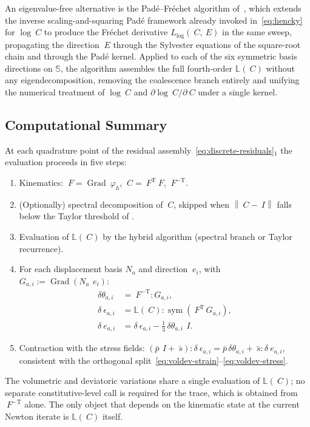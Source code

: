 \documentclass[12pt]{article}
\newcommand{\F}{~F}
\newcommand{\C}{~C}
\newcommand{\eps}{~\epsilon}
\newcommand{\edev}{~e}
\newcommand{\sbar}{\bar{~s}}
\newcommand{\pbar}{\bar{p}}
\newcommand{\Syms}{\mathbb{S}}
\newcommand{\norm}[1]{\left\lVert {#1} \right\rVert}
\DeclareMathOperator{\Grad}{Grad}
\DeclareMathOperator{\sym}{sym}
\newcommand{\transpose}[1]{{#1}^{\mathrm{T}}}
\begin{document}
An eigenvalue-free alternative is the Pad\'e--Fr\'echet algorithm
of~\citet{AlMohy.Higham.Relton:2013}, which extends the inverse
scaling-and-squaring Pad\'e framework already invoked
in~\eqref{eq:hencky} for $\log\C$ to produce the Fr\'echet
derivative $L_{\log}(\C, ~E)$ in the same sweep, propagating the
direction $~E$ through the Sylvester equations of the square-root
chain and through the Pad\'e kernel. Applied to each of the six
symmetric basis directions on $\Syms$, the algorithm assembles the
full fourth-order $\mathbb{L}(\C)$ without any eigendecomposition,
removing the coalescence branch entirely and unifying the numerical
treatment of $\log\C$ and $\partial \log\C / \partial \C$ under a
single kernel.

\subsection{Computational Summary}
\label{app:summary}

At each quadrature point of the residual
assembly~\eqref{eq:discrete-residuals}$_1$ the evaluation proceeds in
five steps:
\begin{enumerate}
  \item Kinematics: $\F = \Grad ~\varphi_h$,
    $\C = \transpose{\F}\F$, $\F^{-\mathrm{T}}$.
  \item (Optionally) spectral decomposition of $\C$, skipped when
    $\norm{\C - ~I}$ falls below the Taylor threshold of
    \citet{Ortiz.Radovitzky.Repetto:2001}.
  \item Evaluation of $\mathbb{L}(\C)$ by the hybrid algorithm
    (spectral branch or Taylor recurrence).
  \item For each displacement basis $N_a$ and direction
    $~e_i$, with $G_{a,i} := \Grad(N_a\, ~e_i)$:
    \begin{align*}
      \delta\theta_{a,i}
        & =
        \F^{-\mathrm{T}} : G_{a,i},
      \\
      \delta\eps_{a,i}
        & =
        \mathbb{L}(\C) : \sym\!\left(\transpose{\F}\, G_{a,i}\right),
      \\
      \delta\edev_{a,i}
        & =
        \delta\eps_{a,i}
        -
        \tfrac{1}{3}\,\delta\theta_{a,i}\, ~I.
    \end{align*}
  \item Contraction with the stress fields:
    $(\pbar\, ~I + \sbar) : \delta\eps_{a,i}
    = \pbar\,\delta\theta_{a,i} + \sbar : \delta\edev_{a,i}$,
    consistent with the orthogonal
    split~\eqref{eq:voldev-strain}--\eqref{eq:voldev-stress}.
\end{enumerate}
The volumetric and deviatoric variations share a single evaluation
of $\mathbb{L}(\C)$; no separate constitutive-level call is required
for the trace, which is obtained from $\F^{-\mathrm{T}}$ alone. The
only object that depends on the kinematic state at the current
Newton iterate is $\mathbb{L}(\C)$ itself.
\end{document}
